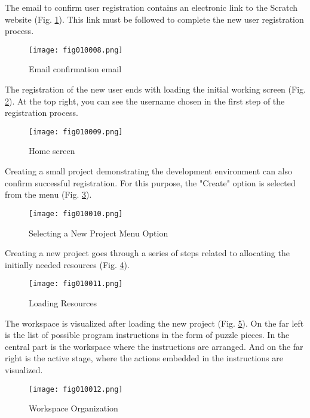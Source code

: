The email to confirm user registration contains an electronic link to the Scratch website (Fig. \ref{fig010008}). This link must be followed to complete the new user registration process.

\begin{figure}[H]
   \centering
   \texttt{[image: fig010008.png]}
   \caption{Email confirmation email}
\label{fig010008}
\end{figure}

The registration of the new user ends with loading the initial working screen (Fig. \ref{fig010009}). At the top right, you can see the username chosen in the first step of the registration process.

\begin{figure}[H]
   \centering
   \texttt{[image: fig010009.png]}
   \caption{Home screen}
\label{fig010009}
\end{figure}

Creating a small project demonstrating the development environment can also confirm successful registration. For this purpose, the "Create" option is selected from the menu (Fig. \ref{fig010010}).

\begin{figure}[H]
   \centering
   \texttt{[image: fig010010.png]}
   \caption{Selecting a New Project Menu Option}
\label{fig010010}
\end{figure}

Creating a new project goes through a series of steps related to allocating the initially needed resources (Fig. \ref{fig010011}).

\begin{figure}[H]
   \centering
   \texttt{[image: fig010011.png]}
   \caption{Loading Resources}
\label{fig010011}
\end{figure}

The workspace is visualized after loading the new project (Fig. \ref{fig010012}). On the far left is the list of possible program instructions in the form of puzzle pieces. In the central part is the workspace where the instructions are arranged. And on the far right is the active stage, where the actions embedded in the instructions are visualized.

\begin{figure}[H]
   \centering
   \texttt{[image: fig010012.png]}
   \caption{Workspace Organization}
\label{fig010012}
\end{figure}

